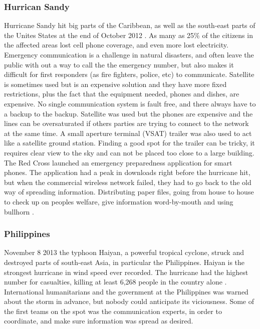 \subsubsection{Hurrican Sandy}
Hurricane Sandy hit big parts of the Caribbean, as well as the south-east parts of the Unites States at the end of October 2012 \cite{WikiSandy}. As many as 25\% of the citizens in the affected areas lost cell phone coverage, and even more lost electricity. Emergency communication is a challenge in natural disasters, and often leave the public with out a way to call the the emergency number, but also makes it difficult for first responders (as fire fighters, police, etc) to communicate.  Satellite is sometimes used but is an expensive solution and they have more fixed restrictions, plus the fact that the equipment needed, phones and dishes, are expensive. No single communication system is fault free, and there always have to a backup to the backup. Satellite was used but the phones are expensive and the lines can be oversaturated if others parties are trying to connect to the network at the same time. A small aperture terminal (VSAT) trailer was also used to act like a satellite ground station. Finding a good spot for the trailer can be tricky, it requires clear view to the sky and can not be placed too close to a large building. The Red Cross launched an emergency preparedness application for smart phones. The application had a peak in downloads right before the hurricane hit, but when the commercial wireless network failed, they had to go back to the old way of spreading information. Distributing paper files, going from house to house to check up on peoples welfare, give information word-by-mouth and using bullhorn \cite{hurricaneSandy}.

\subsubsection{Philippines}
November 8 2013 the typhoon Haiyan, a powerful tropical cyclone, struck and destroyed parts of south-east Asia, in particular the Philippines. Haiyan is the strongest hurricane in wind speed ever recorded. The hurricane had the highest number for casualties, killing at least 6,268 people in the country alone \cite{wikiHaiyan}. International humanitarians and the government at the Philippines was warned about the storm in advance, but nobody could anticipate its viciousness. Some of the first teams on the spot was the communication experts, in order to coordinate, and make sure information was spread as desired.    \cite{disasterResponse} 


